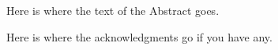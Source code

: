 \documentclass[11pt]{psuthesis2side}
\begin{document}
\begin{frontmatter}


\begin{doublespace}
\titlepage
\end{doublespace}

\committeepage

\abstract

Here is where the text of the Abstract goes.







\tables


\acknowledgments  %

Here is where the acknowledgments go if you have any.



\clearpage


\end{frontmatter}
\end{document}
